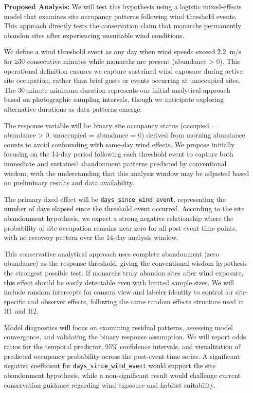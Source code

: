 \textbf{Proposed Analysis:}
We will test this hypothesis using a logistic mixed-effects model that examines site occupancy patterns following wind threshold events. This approach directly tests the conservation claim that monarchs permanently abandon sites after experiencing unsuitable wind conditions.

We define a wind threshold event as any day when wind speeds exceed 2.2~m/s for ≥30 consecutive minutes while monarchs are present (abundance > 0). This operational definition ensures we capture sustained wind exposure during active site occupation, rather than brief gusts or events occurring at unoccupied sites. The 30-minute minimum duration represents our initial analytical approach based on photographic sampling intervals, though we anticipate exploring alternative durations as data patterns emerge.

The response variable will be binary site occupancy status (occupied = abundance > 0, unoccupied = abundance = 0) derived from morning abundance counts to avoid confounding with same-day wind effects. We propose initially focusing on the 14-day period following each threshold event to capture both immediate and sustained abandonment patterns predicted by conventional wisdom, with the understanding that this analysis window may be adjusted based on preliminary results and data availability.

The primary fixed effect will be \texttt{days\_since\_wind\_event}, representing the number of days elapsed since the threshold event occurred. According to the site abandonment hypothesis, we expect a strong negative relationship where the probability of site occupation remains near zero for all post-event time points, with no recovery pattern over the 14-day analysis window.

This conservative analytical approach uses complete abandonment (zero abundance) as the response threshold, giving the conventional wisdom hypothesis the strongest possible test. If monarchs truly abandon sites after wind exposure, this effect should be easily detectable even with limited sample sizes. We will include random intercepts for camera view and labeler identity to control for site-specific and observer effects, following the same random effects structure used in H1 and H2.

Model diagnostics will focus on examining residual patterns, assessing model convergence, and validating the binary response assumption. We will report odds ratios for the temporal predictor, 95\% confidence intervals, and visualization of predicted occupancy probability across the post-event time series. A significant negative coefficient for \texttt{days\_since\_wind\_event} would support the site abandonment hypothesis, while a non-significant result would challenge current conservation guidance regarding wind exposure and habitat suitability.

